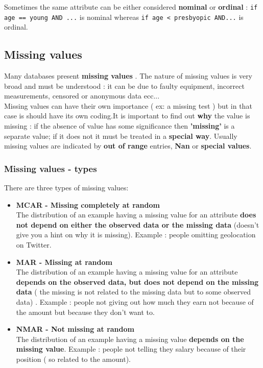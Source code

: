 Sometimes the same attribute can be either considered \textbf{nominal} or \textbf{ordinal} : \texttt{if age == young AND ...} is nominal whereas \texttt{if age < presbyopic AND...} is ordinal.\\

\subsection{Missing values}
Many databases present \textbf{missing values} . The nature of missing values is very broad and must be understood : it can be due to faulty equipment, incorrect measurements, censored or anonymous data  ecc...\\
Missing values can have their own importance ( ex: a missing test ) but in that case is should have its own coding.It is important to find out \textbf{why} the value is missing : if the absence of value has some significance then \textbf{'missing'} is a separate value; if it does not it must be treated in a \textbf{special way}.
Usually missing values are indicated by \textbf{out of range } entries, \textbf{Nan} or \textbf{special values}. \\
\subsubsection{Missing values - types}
There are three types of missing values:
\begin{itemize}
\item \textbf{MCAR - Missing completely at random}\\
The distribution of an example having a missing value for an attribute \textbf{does not depend on either the observed data or the missing data} (doesn't give you a hint on why it is missing). Example : people omitting geolocation on Twitter.
\item  \textbf{MAR - Missing at random}\\
The distribution of an example having a missing value for an attribute \textbf{depends on the observed data, but does not depend on the missing data} ( the missing is not related to the missing data but to some observed data) . Example : people not giving out how much they earn not because of the amount but because they don't want to.
\item \textbf{NMAR - Not missing at random}\\
The distribution of an example having a missing value  \textbf{depends on the missing value}.
Example : people not telling they salary because of their position ( so related to the amount).
\end{itemize}
